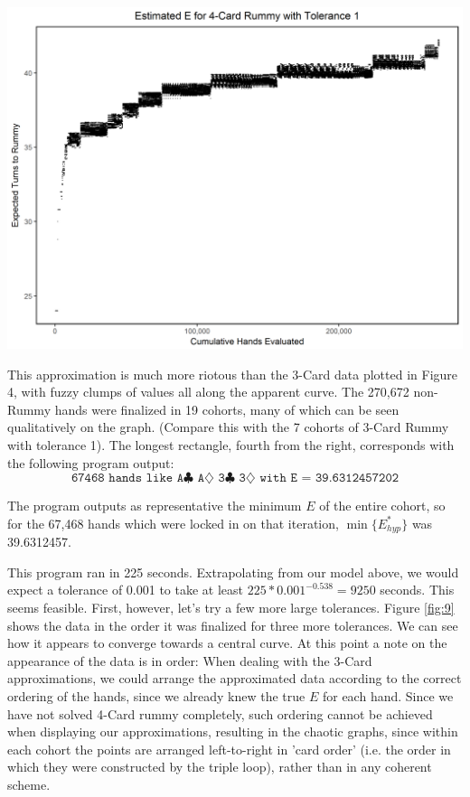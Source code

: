 \documentclass[paper=a4, fontsize=11pt,twoside]{report}   %
\begin{document}
\smallskip
\includegraphics[width=\textwidth]{fig8.png}

This approximation is much more riotous than the 3-Card data plotted in Figure 4, with fuzzy clumps of values all along the apparent curve. The 270,672 non-Rummy hands were finalized in 19 cohorts, many of which can be seen qualitatively on the graph. (Compare this with the 7 cohorts of 3-Card Rummy with tolerance 1). The longest rectangle, fourth from the right, corresponds with the following program output:
$$\texttt{67468 hands like A$\clubsuit$ A$\diamondsuit$ 3$\clubsuit$ 3$\diamondsuit$ with E = 39.6312457202}$$

The program outputs as representative the minimum $E$ of the entire cohort, so for the 67,468 hands which were locked in on that iteration, $\min\{E_{hyp}^*\}$ was 39.6312457. 

This program ran in 225 seconds. Extrapolating from our model above, we would expect a tolerance of 0.001 to take at least $225 * 0.001^{-0.538} = 9250$ seconds. This seems feasible. First, however, let's try a few more large tolerances. Figure \ref{fig:9} shows the data in the order it was finalized for three more tolerances. We can see how it appears to converge towards a central curve. At this point a note on the appearance of the data is in order: When dealing with the 3-Card approximations, we could arrange the approximated data according to the correct ordering of the hands, since we already knew the true $E$ for each hand. Since we have not solved 4-Card rummy completely, such ordering cannot be achieved when displaying our approximations, resulting in the chaotic graphs, since within each cohort the points are arranged left-to-right in 'card order' (i.e. the order in which they were constructed by the triple loop), rather than in any coherent scheme.
\end{document}

